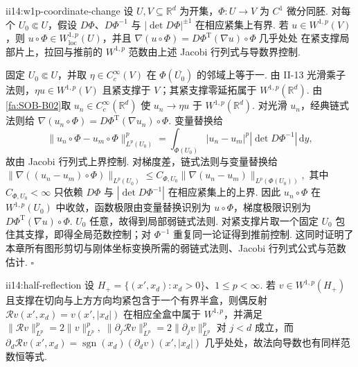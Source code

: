 \begin{FALemma}{ii14:w1p-coordinate-change}
设 \(\displaystyle U,V\subseteq\mathbb R^d\) 为开集，\(\displaystyle\Phi:U\to V\) 为 \(\displaystyle C^1\) 微分同胚. 对每个 \(\displaystyle U_0\Subset U\)，假设 \(\displaystyle D\Phi\)、\(\displaystyle D\Phi^{-1}\) 与 \(\displaystyle |\det D\Phi|^{\pm1}\) 在相应紧集上有界. 若 \(\displaystyle u\in W^{1,p}(V)\)，则 \(\displaystyle u\circ\Phi\in W^{1,p}_{\mathrm{loc}}(U)\)，并且 \(\displaystyle \nabla(u\circ\Phi) = D\Phi^\mathrm{T}(\nabla u)\circ\Phi \;\text{几乎处处}\)
在紧支撑局部片上，拉回与推前的 \(\displaystyle W^{1,p}\) 范数由上述 Jacobi 行列式与导数界控制.
\end{FALemma}

\begin{FAProof}
固定 \(\displaystyle U_0\Subset U\)，并取 \(\displaystyle\eta\in C_c^\infty(V)\) 在 \(\displaystyle\Phi(\overline{U_0})\) 的邻域上等于一. 由 II-13 光滑乘子法则，\(\displaystyle\eta u\in W^{1,p}(V)\) 且紧支撑于 \(\displaystyle V\)；其紧支撑零延拓属于 \(\displaystyle W^{1,p}(\mathbb R^d)\). 由\autoref{fa:SOB-B02}取 \(\displaystyle u_n\in C_c^\infty(\mathbb R^d)\) 使 \(\displaystyle u_n\to\eta u\) 于 \(\displaystyle W^{1,p}(\mathbb R^d)\). 对光滑 \(\displaystyle u_n\)，经典链式法则给 \(\displaystyle\nabla(u_n\circ\Phi)=D\Phi^\mathrm{T}(\nabla u_n)\circ\Phi\). 变量替换给
\[
\|u_n\circ\Phi-u_m\circ\Phi\|_{L^p(U_0)}^p
=
\int_{\Phi(U_0)}|u_n-u_m|^p|\det D\Phi^{-1}|\,\mathrm{d}y,
\]
故由 Jacobi 行列式上界控制. 对梯度差，链式法则与变量替换给 \(\displaystyle \|\nabla((u_n-u_m)\circ\Phi)\|_{L^p(U_0)} \leqslant C_{\Phi,U_0}\|\nabla(u_n-u_m)\|_{L^p(\Phi(U_0))},\)
其中 \(\displaystyle C_{\Phi,U_0}<\infty\) 只依赖 \(\displaystyle D\Phi\) 与 \(\displaystyle |\det D\Phi^{-1}|\) 在相应紧集上的上界. 因此 \(\displaystyle u_n\circ\Phi\) 在 \(\displaystyle W^{1,p}(U_0)\) 中收敛，函数极限由变量替换识别为 \(\displaystyle u\circ\Phi\)，梯度极限识别为 \(\displaystyle D\Phi^\mathrm{T}(\nabla u)\circ\Phi\). \(\displaystyle U_0\) 任意，故得到局部弱链式法则. 对紧支撑片取一个固定 \(\displaystyle U_0\) 包住其支撑，即得全局范数控制；对 \(\displaystyle\Phi^{-1}\) 重复同一论证得到推前控制. 这同时证明了本章所有图形剪切与刚体坐标变换所需的弱链式法则、Jacobi 行列式公式与范数估计.
\hfill\(\square\)
\end{FAProof}

\begin{FALemma}[B][平坦边界的反射延拓]{ii14:half-reflection}
设 \(\displaystyle H_+=\{(x',x_d):x_d>0\}\)、\(\displaystyle1\leqslant p<\infty\). 若 \(\displaystyle v\in W^{1,p}(H_+)\) 且支撑在切向与上方方向均紧包含于一个有界半盒，则偶反射 \(\displaystyle \mathcal Rv(x',x_d)=v(x',|x_d|)\)
在相应全盒中属于 \(\displaystyle W^{1,p}\)，并满足 \(\displaystyle \|\mathcal Rv\|_{L^p}^p=2\|v\|_{L^p}^p, \; \|\partial_j\mathcal Rv\|_{L^p}^p=2\|\partial_jv\|_{L^p}^p\)
对 \(\displaystyle j<d\) 成立，而 \(\displaystyle\partial_d\mathcal Rv(x',x_d)=\operatorname{sgn}(x_d)(\partial_dv)(x',|x_d|)\) 几乎处处，故法向导数也有同样范数恒等式.
\end{FALemma}

